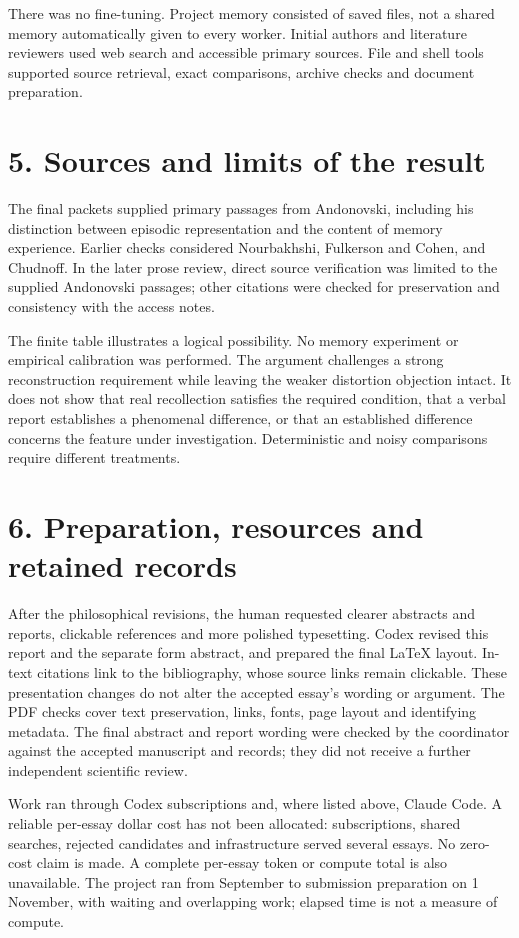 There was no fine-tuning. Project memory consisted of saved files, not a shared memory automatically given to every worker. Initial authors and literature reviewers used web search and accessible primary sources. File and shell tools supported source retrieval, exact comparisons, archive checks and document preparation.

\section*{5. Sources and limits of the result}

The final packets supplied primary passages from Andonovski, including his distinction between episodic representation and the content of memory experience. Earlier checks considered Nourbakhshi, Fulkerson and Cohen, and Chudnoff. In the later prose review, direct source verification was limited to the supplied Andonovski passages; other citations were checked for preservation and consistency with the access notes.

The finite table illustrates a logical possibility. No memory experiment or empirical calibration was performed. The argument challenges a strong reconstruction requirement while leaving the weaker distortion objection intact. It does not show that real recollection satisfies the required condition, that a verbal report establishes a phenomenal difference, or that an established difference concerns the feature under investigation. Deterministic and noisy comparisons require different treatments.

\section*{6. Preparation, resources and retained records}

After the philosophical revisions, the human requested clearer abstracts and reports, clickable references and more polished typesetting. Codex revised this report and the separate form abstract, and prepared the final LaTeX layout. In-text citations link to the bibliography, whose source links remain clickable. These presentation changes do not alter the accepted essay's wording or argument. The PDF checks cover text preservation, links, fonts, page layout and identifying metadata. The final abstract and report wording were checked by the coordinator against the accepted manuscript and records; they did not receive a further independent scientific review.

Work ran through Codex subscriptions and, where listed above, Claude Code. A reliable per-essay dollar cost has not been allocated: subscriptions, shared searches, rejected candidates and infrastructure served several essays. No zero-cost claim is made. A complete per-essay token or compute total is also unavailable. The project ran from September to submission preparation on 1 November, with waiting and overlapping work; elapsed time is not a measure of compute.

